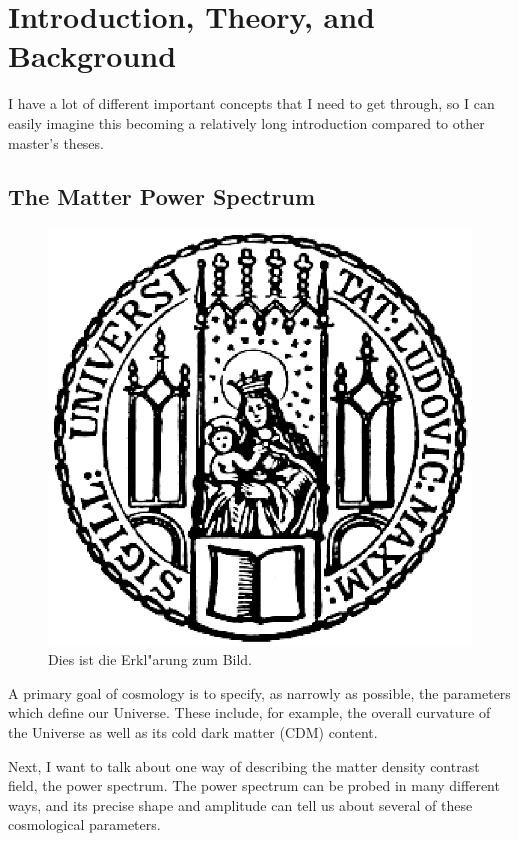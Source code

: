 \chapter{Introduction, Theory, and Background}

I have a lot of different important concepts that I need to get through, so I can easily imagine this becoming a relatively long introduction compared to other master's theses.

\section{The Matter Power Spectrum}


\begin{figure}[htb]
  \centering
  \includegraphics[scale=0.5]{siegel}
  \caption[Kurzform f"ur das Abbildungsverzeichnis]{Dies ist die Erkl"arung zum Bild.}
\end{figure}

A primary goal of cosmology is to specify, as narrowly as possible, the parameters which define our Universe. These include, for example, the overall curvature of the Universe as well as its cold dark matter (CDM) content.

Next, I want to talk about one way of describing the matter density contrast field, the power spectrum. The power spectrum can be probed in many different ways, and its precise shape and amplitude can tell us about several of these cosmological parameters.

